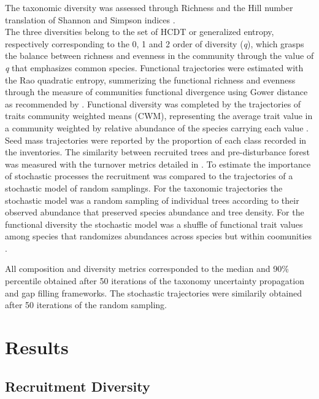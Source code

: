 \documentclass[fleqn,10pt]{ArtEcoFoG} %
\begin{document}
The taxonomic diversity was assessed through Richness and the Hill
number translation of Shannon and Simpson indices
\citep{Hill1973, chao2015estimating, Marcon2015b}.\\
The three diversities belong to the set of HCDT or generalized entropy,
respectively corresponding to the 0, 1 and 2 order of diversity
(\emph{q}), which grasps the balance between richness and evenness in
the community through the value of \emph{q} that emphasizes common
species. Functional trajectories were estimated with the Rao quadratic
entropy, summerizing the functional richness and evenness
\citep{Clark2012} through the measure of communities functional
divergence using Gower distance as recommended by \citet{Pavoine2009}.
Functional diversity was completed by the trajectories of traits
community weighted means (CWM), representing the average trait value in
a community weighted by relative abundance of the species carrying each
value \citep{Diaz2007, Garnier2004, Mason2013}. Seed mass trajectories
were reported by the proportion of each class recorded in the
inventories. The similarity between recruited trees and pre-disturbance
forest was measured with the turnover metrics detailed in
\citet{Podani2013a}. To estimate the importance of stochastic processes
the recruitment was compared to the trajectories of a stochastic model
of random samplings. For the taxonomic trajectories the stochastic model
was a random sampling of individual trees according to their observed
abundance that preserved species abundance and tree density. For the
functional diversity the stochastic model was a shuffle of functional
trait values among species that randomizes abundances across species but
within coomunities \citep{Mason2013}.

All composition and diversity metrics corresponded to the median and
90\% percentile obtained after 50 iterations of the taxonomy uncertainty
propagation and gap filling frameworks. The stochastic trajectories were
similarily obtained after 50 iterations of the random sampling.

\section{Results}\label{results}

\subsection{Recruitment Diversity}\label{recruitment-diversity}
\end{document}
